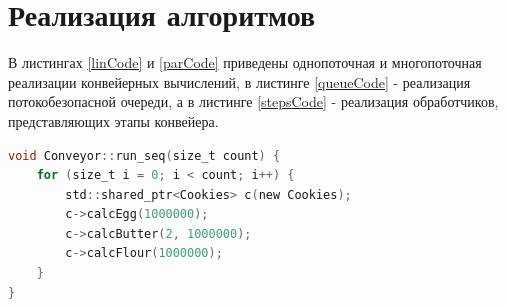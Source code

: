 \documentclass[12pt]{report}
\begin{document}
\section{Реализация алгоритмов}

В листингах \ref{linCode} и \ref{parCode} приведены однопоточная и многопоточная реализации конвейерных вычислений, в листинге \ref{queueCode} - реализация потокобезопасной очереди, а в листинге \ref{stepsCode} - реализация обработчиков, представляющих этапы конвейера.
\begin{lstlisting}[label=linCode,caption=Однопоточная реализация конвейера,language=C]
void Conveyor::run_seq(size_t count) {
    for (size_t i = 0; i < count; i++) {
        std::shared_ptr<Сookies> c(new Cookies);
        c->calcEgg(1000000);
        c->calcButter(2, 1000000);
        c->calcFlour(1000000);
    }
}
\end{lstlisting}
\end{document}
